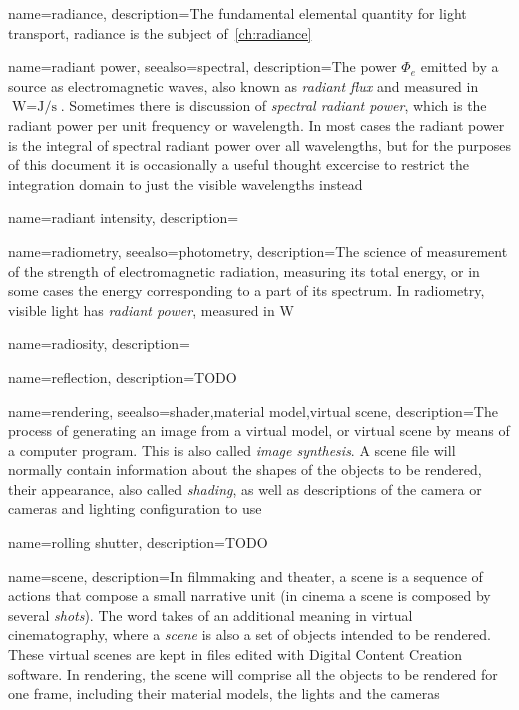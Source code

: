 {
	name=radiance,
	description={The fundamental elemental quantity for light transport, radiance
		is the subject of~\cref{ch:radiance}}
}

{
	name={radiant power},
	seealso={spectral},
	description={The power $\Phi_e$ emitted by a source as electromagnetic waves,
		also known as \textsl{radiant flux} and measured in 
		$\unit{\watt} = \unit{\joule\per\second}$. 
		Sometimes there is discussion of \textsl{spectral radiant power},
		which is the radiant power per unit frequency or wavelength.
		In most cases the radiant power is the integral of spectral radiant power
		over all wavelengths, but for the purposes of this document it is occasionally 
		a useful thought excercise to restrict the integration domain to just the
		visible wavelengths instead}
}

{
	name={radiant intensity},
	description=\nopostdesc
}

{
	name={radiometry},
	seealso={photometry},
	description={The science of measurement of the strength of electromagnetic radiation,
		measuring its total energy, or in some cases the energy corresponding to a part of
		its spectrum. In radiometry, visible light has \textsl{radiant power},
		measured in \unit{\watt}}
}

{
	name={radiosity},
	description=\nopostdesc
}

{
	name={reflection},
	description={TODO}
}

{
	name={rendering},
	seealso={shader,material model,virtual scene},
	description={The process of generating an image from a virtual model, or virtual scene by 
		means of a computer program. This is also called \textsl{image synthesis}. A scene file
		will normally contain information about the shapes of the objects to be rendered, their
		appearance, also called \textsl{shading}, as well as descriptions of the camera or cameras and lighting configuration
		to use}
}

{
	name={rolling shutter},
	description={TODO}
}

{
    name={scene},
	description={In filmmaking and theater, a scene is a sequence of actions that compose
		a small narrative unit (in cinema a scene is composed by several 
		\textsl{shots}). 
		The word takes of an additional meaning in virtual cinematography, 
		where a \textsl{scene} is also a set of objects intended to be rendered.
		These virtual scenes are kept in files edited with 
		Digital Content Creation software.
		In rendering, the scene will comprise all the objects to be rendered for one frame,
		including their material models, the lights and the cameras}
}

